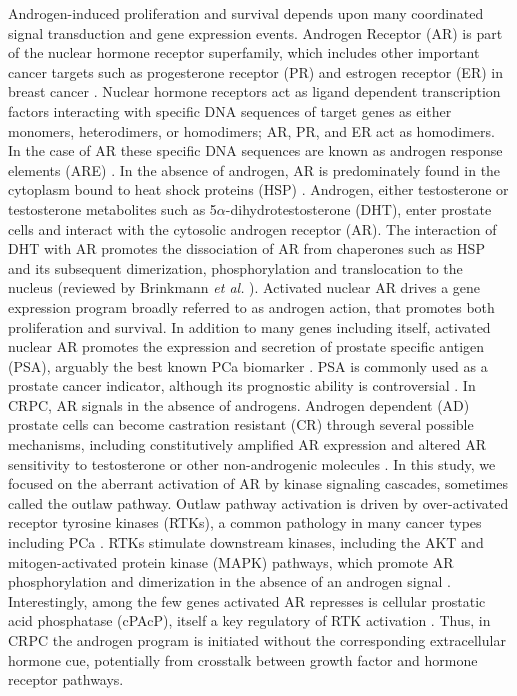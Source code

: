 \documentclass[12pt]{article}
\begin{document}
Androgen-induced proliferation and survival depends upon many coordinated signal transduction and gene expression events. 
Androgen Receptor (AR) is part of the nuclear hormone receptor superfamily, which includes other important cancer targets such as progesterone receptor (PR) and estrogen receptor (ER) in breast cancer \cite{Aranda2001}. 
Nuclear hormone receptors act as ligand dependent transcription factors interacting with specific DNA sequences of target genes as either monomers, heterodimers, or homodimers; AR, PR, and ER act as homodimers. 
In the case of AR these specific DNA sequences are known as androgen response elements (ARE) \cite{Mangelsdorf1995}.
In the absence of androgen, AR is predominately found in the cytoplasm bound to heat shock proteins (HSP) \cite{Prescott2006}.
Androgen, either testosterone or testosterone metabolites such as 5$\alpha$-dihydrotestosterone (DHT), enter prostate cells and interact with the cytosolic androgen receptor (AR). 
The interaction of DHT with AR promotes the dissociation of AR from chaperones such as HSP \citep{Pratt:1997kx} and its subsequent dimerization, phosphorylation and translocation to the nucleus (reviewed by Brinkmann \textit{et al.} \citep{Brinkmann1999}). 
Activated nuclear AR drives a gene expression program broadly referred to as androgen action, that promotes both proliferation and survival.
In addition to many genes including itself, activated nuclear AR promotes the expression and secretion of prostate specific antigen (PSA), arguably the best known PCa biomarker \citep{Feldman2001}.
PSA is commonly used as a prostate cancer indicator, although its prognostic ability is controversial \citep{Attard2009,Hoffman2011,Moyer2012}. 
In CRPC, AR signals in the absence of androgens. 
Androgen dependent (AD) prostate cells can become castration resistant (CR) through several possible mechanisms, including constitutively amplified AR expression and altered AR sensitivity to testosterone or other non-androgenic molecules \citep{Feldman2001}. 
In this study, we focused on the aberrant activation of AR by kinase signaling cascades, sometimes called the outlaw pathway. 
Outlaw pathway activation is driven by over-activated receptor tyrosine kinases (RTKs), a common pathology in many cancer types including PCa \citep{Slamon1989,Craft1999}. 
RTKs stimulate downstream kinases, including the AKT and mitogen-activated protein kinase (MAPK) pathways, which promote AR phosphorylation and dimerization in the absence of an androgen signal \citep{Craft1999,Yeh1999}. 
Interestingly, among the few genes activated AR represses is cellular prostatic acid phosphatase (cPAcP), itself a key regulatory of RTK activation \cite{Veeramani2005}. 
Thus, in CRPC the androgen program is initiated without the corresponding extracellular hormone cue, potentially from crosstalk between growth factor and hormone receptor pathways.
\end{document}
